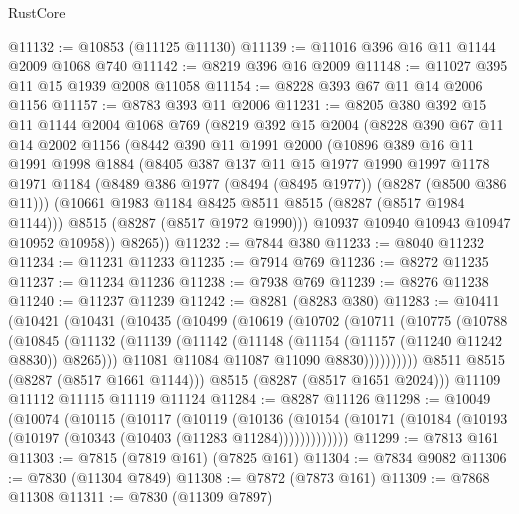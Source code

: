 \begin{lexlean}{RustCore}
\begin{coremodule}
@11132 := @10853 (@11125 @11130)
@11139 := @11016 @396 @16 @11 @1144 @2009 @1068 @740
@11142 := @8219 @396 @16 @2009
@11148 := @11027 @395 @11 @15 @1939 @2008 @11058
@11154 := @8228 @393 @67 @11 @14 @2006 @1156
@11157 := @8783 @393 @11 @2006
@11231 := @8205
    @380
    @392
    @15
    @11
    @1144
    @2004
    @1068
    @769
    (@8219
      @392
      @15
      @2004
      (@8228
        @390
        @67
        @11
        @14
        @2002
        @1156
        (@8442
          @390
          @11
          @1991
          @2000
          (@10896
            @389
            @16
            @11
            @1991
            @1998
            @1884
            (@8405
              @387
              @137
              @11
              @15
              @1977
              @1990
              @1997
              @1178
              @1971
              @1184
              (@8489 @386 @1977 (@8494 (@8495 @1977)) (@8287 (@8500 @386 @11)))
              (@10661 @1983 @1184 @8425 @8511 @8515 (@8287 (@8517 @1984 @1144)))
              @8515
              (@8287 (@8517 @1972 @1990)))
            @10937
            @10940
            @10943
            @10947
            @10952
            @10958))
        @8265))
@11232 := @7844 @380
@11233 := @8040 @11232
@11234 := @11231 @11233
@11235 := @7914 @769
@11236 := @8272 @11235
@11237 := @11234 @11236
@11238 := @7938 @769
@11239 := @8276 @11238
@11240 := @11237 @11239
@11242 := @8281 (@8283 @380)
@11283 := @10411
    (@10421
      (@10431
        (@10435
          (@10499
            (@10619
              (@10702
                (@10711
                  (@10775
                    (@10788
                      (@10845
                        (@11132
                          (@11139
                            (@11142 (@11148 (@11154 (@11157 (@11240 @11242 @8830)) @8265)))
                            @11081
                            @11084
                            @11087
                            @11090
                            @8830))))))))))
        @8511
        @8515
        (@8287 (@8517 @1661 @1144)))
      @8515
      (@8287 (@8517 @1651 @2024)))
    @11109
    @11112
    @11115
    @11119
    @11124
@11284 := @8287 @11126
@11298 := @10049
    (@10074
      (@10115
        (@10117
          (@10119
            (@10136
              (@10154 (@10171 (@10184 (@10193 (@10197 (@10343 (@10403 (@11283 @11284)))))))))))))
@11299 := @7813 @161
@11303 := @7815 (@7819 @161) (@7825 @161)
@11304 := @7834 @9082
@11306 := @7830 (@11304 @7849)
@11308 := @7872 (@7873 @161)
@11309 := @7868 @11308
@11311 := @7830 (@11309 @7897)

\end{coremodule}
\end{lexlean}

